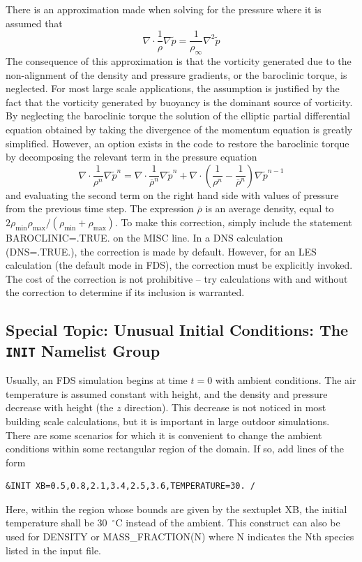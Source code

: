 \documentclass[11pt]{book}
\newcommand{\tp}{\tilde{p}}
\newcommand{\be}{\begin{equation}}
\newcommand{\ee}{\end{equation}}
\begin{document}
There is an approximation made when solving for the pressure where
it is assumed that
\be \nabla \cdot \frac{1}{\rho} \nabla \tp = \frac{1}{\rho_\infty} \nabla^2 \tp \label{Happrox} \ee
The consequence of this approximation is that the vorticity generated
due to the non-alignment of the density and pressure gradients, or the
baroclinic torque, is neglected. For most large scale applications,
the assumption is justified by the fact that the vorticity generated by
buoyancy is the dominant source of vorticity.
By neglecting the baroclinic torque the
solution of the elliptic partial differential equation obtained by
taking the divergence of the momentum equation is greatly simplified.
However, an option exists in the code to restore the baroclinic torque by
decomposing the relevant term in the pressure equation
\be \nabla \cdot \frac{1}{\rho^n} \nabla \tp^n = \nabla \cdot \frac{1}{\overline{\rho}^n} \nabla \tp^n +
   \nabla \cdot \left( \frac{1}{\rho^n} - \frac{1}{\overline{\rho}^n} \right) \nabla \tp^{n-1}   \ee
and evaluating the second term on the right hand side with values of
pressure from the
previous time step. The expression $\overline{\rho}$ is an average density,
equal to $2 \rho_{\min} \rho_{\max} / (\rho_{\min} + \rho_{\max})$.
To make this correction, simply include the statement {\ct BAROCLINIC=.TRUE.}
on the {\ct MISC} line. In a DNS calculation ({\ct DNS=.TRUE.}), the
correction is made by default. However, for an LES calculation (the default mode in FDS),
the correction must be explicitly invoked. The cost of the
correction is not prohibitive -- try calculations
with and without the correction to determine if its inclusion is
warranted.


\subsection{Special Topic: Unusual Initial Conditions: The \texorpdfstring{{\tt INIT}}{INIT} Namelist Group}
\label{info:INIT}

Usually, an FDS simulation begins at time $t=0$ with ambient conditions. The air temperature is
assumed constant with height, and the density and pressure decrease with height (the $z$ direction). This
decrease is not noticed in most building scale calculations, but it is important in large outdoor
simulations. There are some scenarios for which it is convenient to change the ambient conditions within some
rectangular region of the domain. If so, add lines of the form

\footnotesize
\begin{verbatim}
&INIT XB=0.5,0.8,2.1,3.4,2.5,3.6,TEMPERATURE=30. /
\end{verbatim}
\normalsize
Here, within the region whose bounds are given by the sextuplet {\ct XB},
the initial temperature shall be 30~$^\circ$C instead of the ambient.
This construct can also be used for {\ct DENSITY} or
{\ct MASS\_FRACTION(N)} where {\ct N} indicates the {\ct N}th species listed in the input file.
\end{document}
